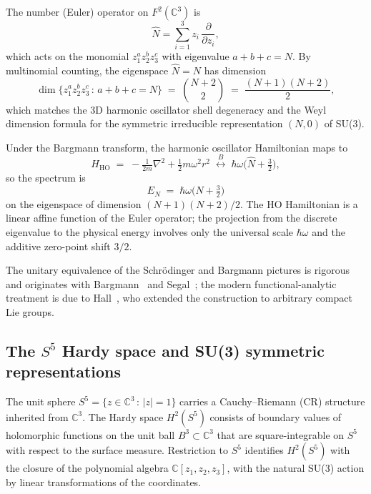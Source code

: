 \documentclass[twocolumn,pra,amsmath,amssymb,superscriptaddress]{revtex4-2}
\begin{document}
The number (Euler) operator on $F^2(\mathbb{C}^3)$ is
\begin{equation}
  \hat{N} = \sum_{i = 1}^{3} z_i\, \frac{\partial}{\partial z_i},
  \label{eq:euler}
\end{equation}
which acts on the monomial $z_1^a z_2^b z_3^c$ with eigenvalue
$a + b + c = N$.  By multinomial counting, the eigenspace
$\hat{N} = N$ has dimension
\begin{equation}
  \dim\bigl\{ z_1^a z_2^b z_3^c \,:\, a + b + c = N \bigr\}
  \;=\;
  \binom{N + 2}{2}
  \;=\;
  \frac{(N+1)(N+2)}{2},
  \label{eq:dim}
\end{equation}
which matches the 3D harmonic oscillator shell degeneracy and the
Weyl dimension formula for the symmetric irreducible representation
$(N, 0)$ of SU(3).

Under the Bargmann transform, the harmonic oscillator Hamiltonian
maps to
\begin{equation}
  H_{\mathrm{HO}}
  \;=\;
  -\tfrac{1}{2 m}\nabla^2 + \tfrac{1}{2} m \omega^2 r^2
  \;\stackrel{B}{\longleftrightarrow}\;
  \hbar \omega \bigl(\hat{N} + \tfrac{3}{2}\bigr),
  \label{eq:H-bargmann}
\end{equation}
so the spectrum is
\begin{equation}
  E_N \;=\; \hbar\omega\bigl(N + \tfrac{3}{2}\bigr)
  \label{eq:HO-spectrum}
\end{equation}
on the eigenspace of dimension $(N+1)(N+2)/2$.  The HO Hamiltonian
is a linear affine function of the Euler operator; the projection
from the discrete eigenvalue to the physical energy involves only
the universal scale $\hbar\omega$ and the additive zero-point
shift $3/2$.

The unitary equivalence of the Schr\"odinger and Bargmann pictures
is rigorous and originates with Bargmann~\cite{bargmann1961} and
Segal~\cite{segal1963}; the modern functional-analytic treatment is
due to Hall~\cite{hall1994}, who extended the construction to
arbitrary compact Lie groups.

\subsection{The $S^5$ Hardy space and SU(3) symmetric representations}

The unit sphere
$S^5 = \{ z \in \mathbb{C}^3 \,:\, |z| = 1 \}$
carries a Cauchy--Riemann (CR) structure inherited from
$\mathbb{C}^3$.  The Hardy space $H^2(S^5)$ consists of boundary
values of holomorphic functions on the unit ball $B^3 \subset
\mathbb{C}^3$ that are square-integrable on $S^5$ with respect to
the surface measure.  Restriction to $S^5$ identifies $H^2(S^5)$
with the closure of the polynomial algebra $\mathbb{C}[z_1, z_2,
z_3]$, with the natural SU(3) action by linear transformations of
the coordinates.
\end{document}

